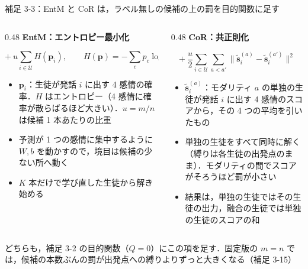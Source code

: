 \begin{frame}{補足 3-3：EntM と CoR は，ラベル無しの候補の上の罰を目的関数に足す}
  \vspace{0.2em}
  \begin{columns}[T,onlytextwidth]
    \begin{column}{0.48\textwidth}
      \textbf{\footnotesize EntM：エントロピー最小化}\par
      {\small\tighteq
      \begin{equation*}
        +\ u \sum_{i \in \mathcal{U}} H(\mathbf{p}_i), \qquad H(\mathbf{p}) = -\sum_{c} p_c \log p_c
      \end{equation*}}
      \begin{itemize}\scriptsize\setlength{\itemsep}{3pt}
        \item $\mathbf{p}_i$：生徒が発話 $i$ に出す 4 感情の確率．$H$ はエントロピー（4 感情に確率が散らばるほど大きい）．$u = m/n$ は候補 1 本あたりの比重
        \item 予測が 1 つの感情に集中するように $W, b$ を動かすので，境目は候補の少ない所へ動く
        \item $K$ 本だけで学び直した生徒から解き始める
      \end{itemize}
    \end{column}
    \begin{column}{0.48\textwidth}
      \textbf{\footnotesize CoR：共正則化}\par
      {\small\tighteq
      \begin{equation*}
        +\ \frac{u}{2} \sum_{i \in \mathcal{U}} \sum_{a < a'} \bigl\|\tilde{\mathbf{s}}^{(a)}_i - \tilde{\mathbf{s}}^{(a')}_i\bigr\|^2
      \end{equation*}}
      \begin{itemize}\scriptsize\setlength{\itemsep}{3pt}
        \item $\tilde{\mathbf{s}}^{(a)}_i$：モダリティ $a$ の単独の生徒が発話 $i$ に出す 4 感情のスコアから，その 4 つの平均を引いたもの
        \item 単独の生徒をすべて同時に解く（縛りは各生徒の出発点のまま）．モダリティの間でスコアがそろうほど罰が小さい
        \item 結果は，単独の生徒ではその生徒の出力，融合の生徒では単独の生徒のスコアの和
      \end{itemize}
    \end{column}
  \end{columns}
  \vspace{0.5em}
  {\raggedright\scriptsize どちらも，補足 3-2 の目的関数（$Q = 0$）にこの項を足す．固定版の $m = n$ では，候補の本数ぶんの罰が出発点への縛りよりずっと大きくなる（補足 3-15）\par}
\end{frame}

